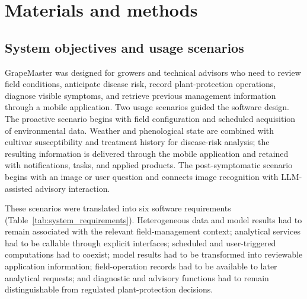\documentclass[12pt]{article}
\begin{document}
\section{Materials and methods}\label{materials-and-methods}

\subsection{System objectives and usage scenarios}\label{system-objectives}

GrapeMaster was designed for growers and technical advisors who need to review field conditions, anticipate disease risk, record plant-protection operations, diagnose visible symptoms, and retrieve previous management information through a mobile application. Two usage scenarios guided the software design. The proactive scenario begins with field configuration and scheduled acquisition of environmental data. Weather and phenological state are combined with cultivar susceptibility and treatment history for disease-risk analysis; the resulting information is delivered through the mobile application and retained with notifications, tasks, and applied products. The post-symptomatic scenario begins with an image or user question and connects image recognition with LLM-assisted advisory interaction.

These scenarios were translated into six software requirements (Table~\ref{tab:system_requirements}). Heterogeneous data and model results had to remain associated with the relevant field-management context; analytical services had to be callable through explicit interfaces; scheduled and user-triggered computations had to coexist; model results had to be transformed into reviewable application information; field-operation records had to be available to later analytical requests; and diagnostic and advisory functions had to remain distinguishable from regulated plant-protection decisions.
\end{document}
